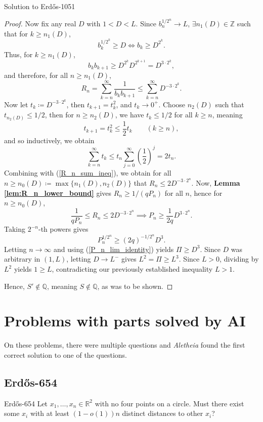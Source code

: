 \documentclass{article}
\theoremstyle{plain}
\theoremstyle{definition}
\newcommand{\Aletheia}{\emph{Aletheia}}
\begin{document}
\begin{solution}{Solution to Erdős-1051}
\begin{proof}
    Now fix any real $D$ with $1<D<L$. Since $b_n^{1/2^n}\to L$, $\exists n_1(D)\in\mathbb{Z}$ such that for $k\geq n_1(D)$, \[b_k^{1/2^k}\geq D\iff b_k\geq D^{2^k}.\] Thus, for $k\geq n_1(D)$, \[b_kb_{k+1}\geq D^{2^k}D^{2^{k+1}}=D^{3\cdot 2^k},\] and therefore, for all $n\geq n_1(D)$, \begin{equation}\label{R_n_sum_ineq}
        R_n=\sum_{k=n}^{\infty}\frac{1}{b_kb_{k+1}}\leq\sum_{k=n}^{\infty}D^{-3\cdot 2^k}.
    \end{equation} Now let $t_k\coloneq D^{-3\cdot 2^k}$, then $t_{k+1}=t_k^2$, and $t_k\to 0^+$. Choose $n_2(D)$ such that $t_{n_2(D)}\leq 1/2$, then for $n\geq n_2(D)$, we have $t_k\leq 1/2$ for all $k\geq n$, meaning \[t_{k+1}=t_k^2\leq\frac{1}{2}t_k\qquad (k\geq n),\] and so inductively, we obtain \[\sum_{k=n}^{\infty}t_k\leq t_n\sum_{j=0}^{\infty}\left(\frac{1}{2}\right)^j=2t_n.\] Combining with (\ref{R_n_sum_ineq}), we obtain for all $n\geq n_0(D)\coloneq\max\{n_1(D),n_2(D)\}$ that $R_n\leq 2D^{-3\cdot 2^n}$. Now, \textbf{Lemma \ref{lem:R_n_lower_bound}} gives $R_n\geq 1/(qP_n)$ for all $n$, hence for $n\geq n_0(D)$, \[\frac{1}{qP_n}\leq R_n\leq 2D^{-3\cdot 2^n}\implies P_n\geq\frac{1}{2q}D^{3\cdot 2^n}.\] Taking $2^{-n}$-th powers gives \[P_n^{1/2^n}\geq(2q)^{-1/2^n}D^3.\] Letting $n\to\infty$ and using (\ref{P_n_lim_identity}) yields $\Pi\geq D^3$. Since $D$ was arbitrary in $(1,L)$, letting $D\to L^-$ gives $L^2=\Pi\geq L^3$. Since $L>0$, dividing by $L^2$ yields $1\geq L$, contradicting our previously established inequality $L>1$.
    
    Hence, $S'\notin\mathbb{Q}$, meaning $S\notin\mathbb{Q}$, as was to be shown.
\end{proof}
\end{solution}

\section{Problems with parts solved by AI} On these problems, there were multiple questions and {\Aletheia} found the first correct solution to one of the questions.
\subsection{Erdős-654}

\begin{problem}{Erdős-654 \cite{Er97e}}
Let $x_1,\ldots,x_n\in \mathbb{R}^2$ with no four points on a circle. Must there exist some $x_i$ with at least $(1-o(1))n$ distinct distances to other $x_i$?
\end{problem}
\end{document}
